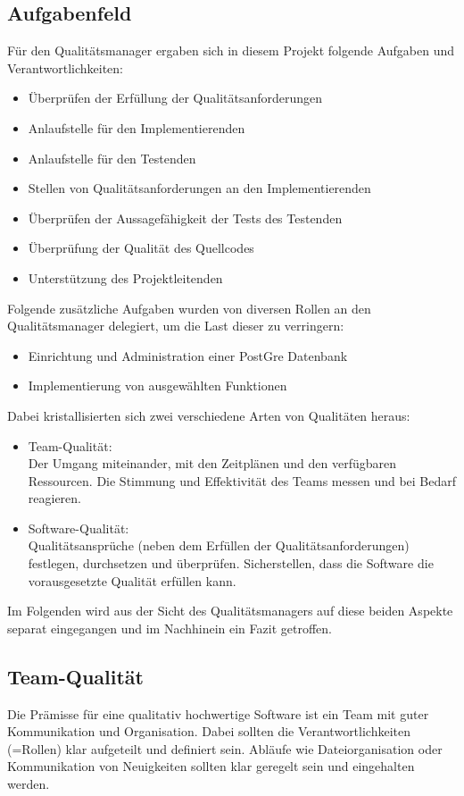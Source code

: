 \subsection{Aufgabenfeld}
Für den Qualitätsmanager ergaben sich in diesem Projekt folgende Aufgaben und Verantwortlichkeiten:
\begin{itemize}
    \item Überprüfen der Erfüllung der Qualitätsanforderungen
    \item Anlaufstelle für den Implementierenden
    \item Anlaufstelle für den Testenden
    \item Stellen von Qualitätsanforderungen an den Implementierenden
    \item Überprüfen der Aussagefähigkeit der Tests des Testenden
    \item Überprüfung der Qualität des Quellcodes
    \item Unterstützung des Projektleitenden
\end{itemize}
Folgende zusätzliche Aufgaben wurden von diversen Rollen an den Qualitätsmanager delegiert, um die Last dieser zu verringern:
\begin{itemize}
    \item Einrichtung und Administration einer PostGre Datenbank
    \item Implementierung von ausgewählten Funktionen
\end{itemize}
Dabei kristallisierten sich zwei verschiedene Arten von Qualitäten heraus:
\begin{itemize}
    \item Team-Qualität:\\
    Der Umgang miteinander, mit den Zeitplänen und den verfügbaren Ressourcen. Die Stimmung und Effektivität des Teams messen und bei Bedarf reagieren.
    \item Software-Qualität:\\
    Qualitätsansprüche (neben dem Erfüllen der Qualitätsanforderungen) festlegen, durchsetzen und überprüfen. Sicherstellen, dass die Software die vorausgesetzte Qualität erfüllen kann.
\end{itemize}
Im Folgenden wird aus der Sicht des Qualitätsmanagers auf diese beiden Aspekte separat eingegangen und im Nachhinein ein Fazit getroffen.
\subsection{Team-Qualität}
Die Prämisse für eine qualitativ hochwertige Software ist ein Team mit guter Kommunikation und Organisation. Dabei sollten die Verantwortlichkeiten (=Rollen) klar aufgeteilt und definiert sein. Abläufe wie Dateiorganisation oder Kommunikation von Neuigkeiten sollten klar geregelt sein und eingehalten werden.

